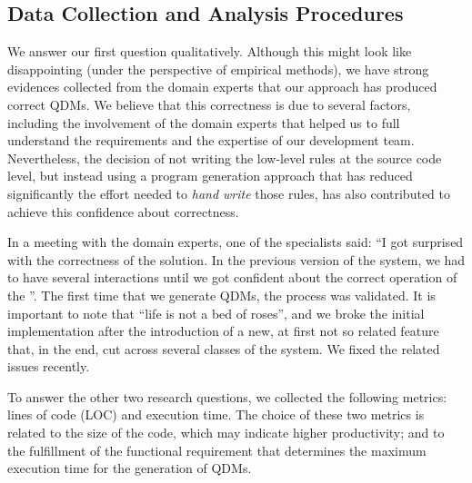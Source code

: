 

\subsection{Data Collection and Analysis Procedures}

We answer our first question qualitatively. Although this might look like disappointing (under the 
perspective of empirical methods), we have strong evidences collected from the domain experts 
that our approach has produced correct QDMs. We believe that this correctness is due to several 
factors, including the involvement of the domain experts that helped us to full understand 
the requirements and the expertise of our development team. Nevertheless, the decision of 
not writing the low-level rules at the source code level, but instead using a program 
generation approach that has reduced significantly the effort needed to \emph{hand write} 
those rules, has also contributed to achieve this confidence about correctness. 

In a meeting 
with the domain experts, one of the specialists said: ``I got surprised with the 
correctness of the solution. In the previous version of the system, we had to have several 
interactions until we got confident about the correct operation of the \callers''. The first 
time that we generate QDMs, the process was validated. It is important to note that ``life is not
a bed of roses'', and we broke the initial implementation after the introduction of a new, 
at first not so related feature that, in the end, cut across several classes of 
the system. We fixed the related issues recently.  

To answer the other two research questions, we collected the following metrics: lines of code (LOC) and execution time. The choice of these 
two metrics is related to the size of the code, which may indicate higher productivity; and to the fulfillment of the 
functional requirement that determines the maximum execution time for the generation of QDMs.

